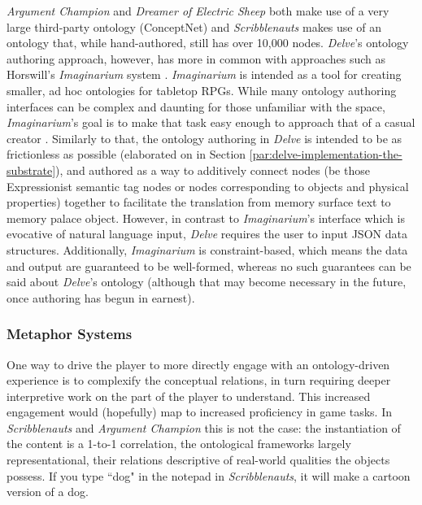 \textit{Argument Champion} and \textit{Dreamer of Electric Sheep} both make use of a very large third-party ontology (ConceptNet) and \textit{Scribblenauts} makes use of an ontology that, while hand-authored, still has over 10,000 nodes. \textit{Delve}'s ontology authoring approach, however, has more in common with approaches such as Horswill's \textit{Imaginarium} system \cite{horswill_2019}. \textit{Imaginarium} is intended as a tool for creating smaller, ad hoc ontologies for tabletop RPGs. While many ontology authoring interfaces can be complex and daunting for those unfamiliar with the space, \textit{Imaginarium}'s goal is to make that task easy enough to approach that of a casual creator \cite{compton-iccc2015}. Similarly to that, the ontology authoring in \textit{Delve} is intended to be as frictionless as possible (elaborated on in Section \ref{par:delve-implementation-the-substrate}), and authored as a way to additively connect nodes (be those Expressionist semantic tag nodes or nodes corresponding to objects and physical properties) together to facilitate the translation from memory surface text to memory palace object. However, in contrast to \textit{Imaginarium}'s interface which is evocative of natural language input, \textit{Delve} requires the user to input JSON data structures. Additionally, \textit{Imaginarium} is constraint-based, which means the data and output are guaranteed to be well-formed, whereas no such guarantees can be said about \textit{Delve}'s ontology (although that may become necessary in the future, once authoring has begun in earnest).

\subsubsection{Metaphor Systems}\label{subsubsec:metaphor-systems}

One way to drive the player to more directly engage with an ontology-driven experience is to complexify the conceptual relations, in turn requiring deeper interpretive work on the part of the player to understand. This increased engagement would (hopefully) map to increased proficiency in game tasks. In \textit{Scribblenauts} and \textit{Argument Champion} this is not the case: the instantiation of the content is a 1-to-1 correlation, the ontological frameworks largely representational, their relations descriptive of real-world qualities the objects possess. If you type ``dog" in the notepad in \textit{Scribblenauts}, it will make a cartoon version of a dog.

